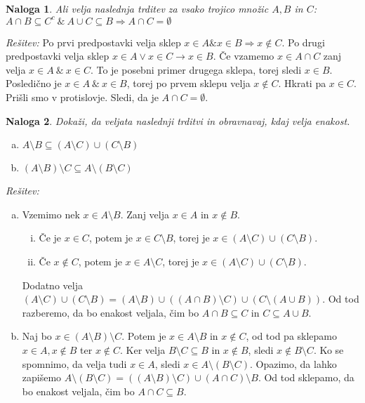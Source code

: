 \documentclass[a4paper, 10pt]{article}
\newtheorem{nal}{Naloga}
\newenvironment{resitev}{\begin{flushleft}\textit{Rešitev:}}{\hfill\end{flushleft}}
\begin{document}
	\begin{nal}
		Ali velja naslednja trditev za vsako trojico množic $A, B$ in $C$:
		$A\cap B \subseteq C^c ~\&~ A\cup C \subseteq B \Rightarrow A\cap C = \emptyset$
	\end{nal}
	\begin{resitev}
		Po prvi predpostavki velja sklep $x\in A \& x\in B \Rightarrow x\notin C$. Po drugi predpostavki velja sklep $x\in A \lor x\in C \rightarrow x\in B$.
		Če vzamemo $x\in A\cap C$ zanj velja $x\in A~\&~x\in C$. To je posebni primer drugega sklepa, torej sledi $x\in B$. Posledično je $x\in A ~\&~ x\in B$, torej po prvem sklepu velja $x\notin C$. Hkrati pa $x\in C$. Prišli smo v protislovje. Sledi, da je $A\cap C = \emptyset$.
	\end{resitev}
	
	\begin{nal}
		Dokaži, da veljata naslednji trditvi in obravnavaj, kdaj velja enakost.
		\begin{enumerate}[a)]
			\item $A\setminus B \subseteq (A\setminus C)\cup (C\setminus B)$
			\item $(A\setminus B)\setminus C \subseteq A\setminus (B\setminus C)$
		\end{enumerate}
	\end{nal}
	\begin{resitev}
		\begin{enumerate}[a)]
			\item Vzemimo nek $x\in A\setminus B$. Zanj velja $x\in A$ in $x\notin B$. \begin{enumerate}[i.]
				\item Če je $x\in C$, potem je $x\in C\setminus B$, torej je $x\in (A\setminus C)\cup (C\setminus B)$.
				\item Če $x\notin C$, potem je $x\in A\setminus C$, torej je $x\in (A\setminus C)\cup (C\setminus B)$.
			\end{enumerate}
			Dodatno velja $(A\setminus C)\cup (C\setminus B) = (A\setminus B) \cup ((A\cap B)\setminus C) \cup (C\setminus(A\cup B))$. Od tod razberemo, da bo enakost veljala, čim bo $A\cap B \subseteq C$ in $C\subseteq A\cup B$.
			\item Naj bo $x\in (A\setminus B)\setminus C$. Potem je $x\in A\setminus B$ in $x\notin C$, od tod pa sklepamo $x\in A, x\notin B$ ter $x\notin C$. Ker velja $B\setminus C \subseteq B$ in $x\notin B$, sledi $x\notin B\setminus C$. Ko se spomnimo, da velja tudi $x\in A$, sledi $x\in A\setminus(B\setminus C)$.
			Opazimo, da lahko zapišemo $A\setminus(B\setminus C) = ((A\setminus B)\setminus C) \cup (A\cap C)\setminus B$. Od tod sklepamo, da bo enakost veljala, čim bo $A\cap C \subseteq B$.
		\end{enumerate}
	\end{resitev}
\end{document}
